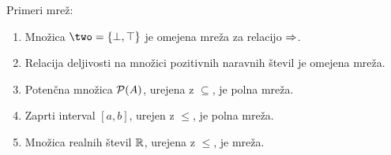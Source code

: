 \begin{primer}
  Primeri mrež:
  \begin{enumerate}
  \item Množica $\two = \set{\bot, \top}$ je omejena mreža za relacijo $\Rightarrow$.
  \item Relacija deljivosti na množici pozitivnih naravnih števil je omejena mreža.
  \item Potenčna množica $\mathcal{P}(A)$, urejena z $\subseteq$, je polna mreža.
  \item Zaprti interval $[a,b]$, urejen z $\leq$, je polna mreža.
  \item Množica realnih števil $\mathbb{R}$, urejena z $\leq$, je mreža.
  \end{enumerate}
\end{primer}

